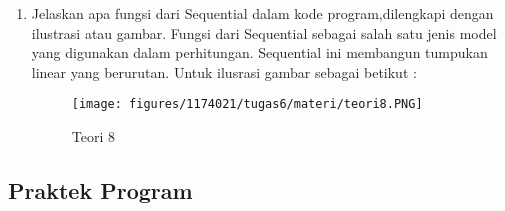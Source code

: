 \begin{enumerate}
	\item Jelaskan apa fungsi dari Sequential dalam kode program,dilengkapi dengan ilustrasi atau gambar.
	\hfill\break
	Fungsi dari Sequential sebagai salah satu jenis model yang digunakan dalam perhitungan. Sequential ini membangun tumpukan linear yang berurutan. Untuk ilusrasi gambar sebagai betikut : 

	\begin{figure}[H]
	\centering
		\texttt{[image: figures/1174021/tugas6/materi/teori8.PNG]}
		\caption{Teori 8}
	\end{figure}
\end{enumerate}

\subsection{Praktek Program}
